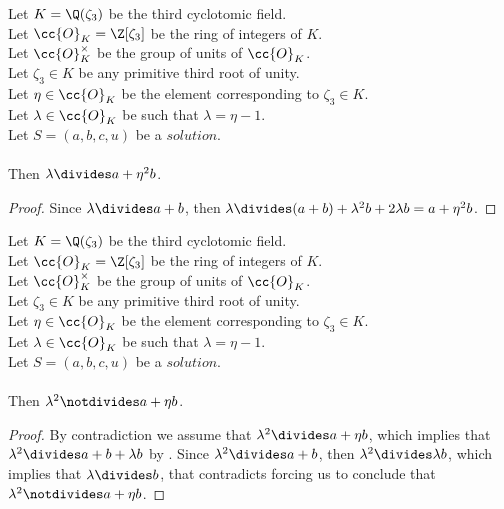 \begin{lemma}
  \label{lmm:lambda_dvd_a_add_eta_sq_mul_b}
  \leanok
  Let $K = \Q(\zeta_3)$ be the third cyclotomic field. \\
  Let $\cc{O}_K = \Z[\zeta_3]$ be the ring of integers of $K$. \\
  Let $\cc{O}^\times_K$ be the group of units of $\cc{O}_K$. \\
  Let $\zeta_3 \in K$ be any primitive third root of unity. \\
  Let $\eta \in \cc{O}_K$ be the element corresponding to $\zeta_3 \in K$. \\
  Let $\lambda \in \cc{O}_K$ be such that $\lambda = \eta -1$. \\
  Let $S=(a, b, c, u)$ be a $solution$.\\\\
  Then $\lambda \divides a + \eta^2  b$.
\end{lemma}
\begin{proof}
  \leanok
  Since $\lambda \divides a+b$, then
  $\lambda \divides (a + b) + \lambda^2  b + 2  \lambda  b
  = a + \eta^2  b$.
\end{proof}

\begin{lemma}
  \label{lmm:lambda_sq_not_dvd_a_add_eta_mul_b}
  \leanok
  Let $K = \Q(\zeta_3)$ be the third cyclotomic field. \\
  Let $\cc{O}_K = \Z[\zeta_3]$ be the ring of integers of $K$. \\
  Let $\cc{O}^\times_K$ be the group of units of $\cc{O}_K$. \\
  Let $\zeta_3 \in K$ be any primitive third root of unity. \\
  Let $\eta \in \cc{O}_K$ be the element corresponding to $\zeta_3 \in K$. \\
  Let $\lambda \in \cc{O}_K$ be such that $\lambda = \eta -1$. \\
  Let $S=(a, b, c, u)$ be a $solution$.\\\\
  Then $\lambda^2 \notdivides a + \eta b$.
\end{lemma}
\begin{proof}
  \leanok
  By contradiction we assume that $\lambda^2 \divides a + \eta b$, which implies that
  $\lambda^2 \divides a + b + \lambda  b$ by .
  Since $\lambda^2 \divides a+b$, then $\lambda^2 \divides \lambda  b$, which implies that
  $\lambda \divides b$, that contradicts  forcing us to conclude that
  $\lambda^2 \notdivides a + \eta b$.
\end{proof}

